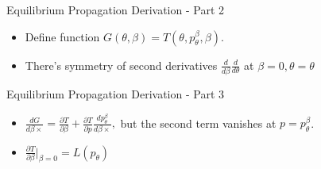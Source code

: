\documentclass{beamer}
\begin{document}
\begin{frame}{Equilibrium Propagation Derivation - Part 2}
  \begin{itemize}
    \item Define function $G(\theta,\beta) = T(\theta,p_{\theta}^{\beta}, \beta)$.
    \item There's symmetry of second derivatives $\frac{d}{d\beta}\frac{d}{d\theta} $ at $\beta = 0, \theta = \theta$

  \end{itemize}
\end{frame}

\begin{frame}{Equilibrium Propagation Derivation - Part 3}
  \begin{itemize}
    \item $\frac{dG}{d\beta×} = \frac{\partial T}{\partial \beta} + \frac{\partial T}{\partial p} \frac{d p_\theta^\beta}{d\beta×},$ but the second term vanishes at $p = p_\theta^\beta$.
    \item $ \frac{\partial T}{\partial \beta}\big|_{\beta = 0} = L(p_\theta)$
  \end{itemize}
\end{frame}
\end{document}
